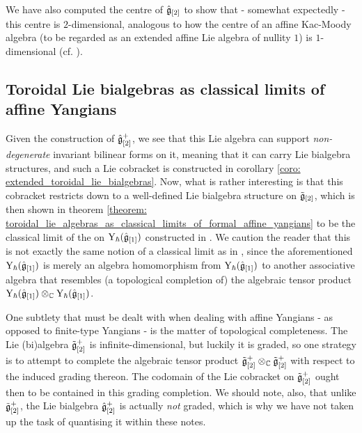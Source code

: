             We have also computed the centre of $\hat{\mathfrak{g}}_{[2]}$ to show that - somewhat expectedly - this centre is $2$-dimensional, analogous to how the centre of an affine Kac-Moody algebra (to be regarded as an extended affine Lie algebra of nullity $1$) is $1$-dimensional (cf. \cite[Chapter 7]{kac_infinite_dimensional_lie_algebras}). 

        \subsection{Toroidal Lie bialgebras as classical limits of affine Yangians}
            Given the construction of $\hat{\mathfrak{g}}_{[2]}^+$, we see that this Lie algebra can support \textit{non-degenerate} invariant bilinear forms on it, meaning that it can carry Lie bialgebra structures, and such a Lie cobracket is constructed in corollary \ref{coro: extended_toroidal_lie_bialgebras}. Now, what is rather interesting is that this cobracket restricts down to a well-defined Lie bialgebra structure on $\tilde{\mathfrak{g}}_{[2]}$, which is then shown in theorem \ref{theorem: toroidal_lie_algebras_as_classical_limits_of_formal_affine_yangians} to be the classical limit of the  on $\mathrm{Y}_{\hbar}(\hat{\mathfrak{g}}_{[1]})$ constructed in \cite{guay_nakajima_wendlandt_affine_yangian_coproduct}. We caution the reader that this is not exactly the same notion of a classical limit as in \cite{etingof_kazhdan_quantisation_1}, since the aforementioned  $\mathrm{Y}_{\hbar}(\hat{\mathfrak{g}}_{[1]})$ is merely an algebra homomorphism from $\mathrm{Y}_{\hbar}(\hat{\mathfrak{g}}_{[1]})$ to another associative algebra that resembles (a topological completion of) the algebraic tensor product $\rmY_{\hbar}(\hat{\g}_{[1]}) \tensor_{\bbC} \rmY_{\hbar}(\hat{\g}_{[1]})$. 

            One subtlety that must be dealt with when dealing with affine Yangians - as opposed to finite-type Yangians - is the matter of topological completeness. The Lie (bi)algebra $\tilde{\mathfrak{g}}_{[2]}^+$ is infinite-dimensional, but luckily it is graded, so one strategy is to attempt to complete the algebraic tensor product $\tilde{\g}_{[2]}^+ \tensor_{\bbC} \tilde{\g}_{[2]}^+$ with respect to the induced grading thereon. The codomain of the Lie cobracket on $\tilde{\mathfrak{g}}_{[2]}^+$ ought then to be contained in this grading completion. We should note, also, that unlike $\tilde{\mathfrak{g}}_{[2]}^+$, the Lie bialgebra $\hat{\mathfrak{g}}_{[2]}^+$ is actually \textit{not} graded, which is why we have not taken up the task of quantising it within these notes. 

